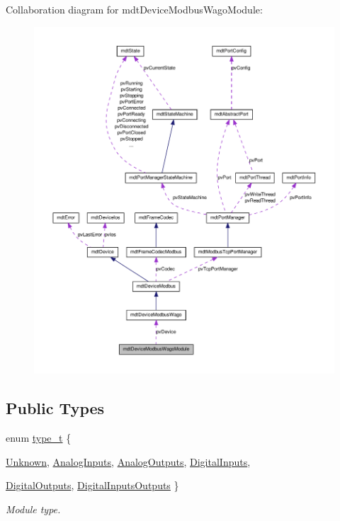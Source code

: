 Collaboration diagram for mdtDeviceModbusWagoModule:\nopagebreak
\begin{figure}[H]
\begin{center}
\leavevmode
\includegraphics[width=400pt]{classmdt_device_modbus_wago_module__coll__graph}
\end{center}
\end{figure}
\subsection*{Public Types}
\begin{DoxyCompactItemize}
\item 
enum \hyperlink{classmdt_device_modbus_wago_module_a2d8f6895b2a031c953bd91c2f65a1a25}{type\_\-t} \{ \par
\hyperlink{classmdt_device_modbus_wago_module_a2d8f6895b2a031c953bd91c2f65a1a25aa195556cb75e827f16f81e9f09908660}{Unknown}, 
\hyperlink{classmdt_device_modbus_wago_module_a2d8f6895b2a031c953bd91c2f65a1a25a70609836e6ef603f912da6084adf3c9d}{AnalogInputs}, 
\hyperlink{classmdt_device_modbus_wago_module_a2d8f6895b2a031c953bd91c2f65a1a25a38c67b211155faa87f52767c60134f33}{AnalogOutputs}, 
\hyperlink{classmdt_device_modbus_wago_module_a2d8f6895b2a031c953bd91c2f65a1a25aee246eb286603d48008177621980eda4}{DigitalInputs}, 
\par
\hyperlink{classmdt_device_modbus_wago_module_a2d8f6895b2a031c953bd91c2f65a1a25ace992008f0003a8ee2106872b6a410a3}{DigitalOutputs}, 
\hyperlink{classmdt_device_modbus_wago_module_a2d8f6895b2a031c953bd91c2f65a1a25adbe63d8313a77922b9a7808a5321fdb7}{DigitalInputsOutputs}
 \}
\begin{DoxyCompactList}\small\item\em Module type. \end{DoxyCompactList}\end{DoxyCompactItemize}
